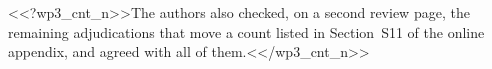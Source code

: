 <<?wp3_cnt_n>>The authors also checked, on a second review page, the remaining adjudications that move a count listed in Section~S11 of the online appendix, and agreed with all of them.<</wp3_cnt_n>>
